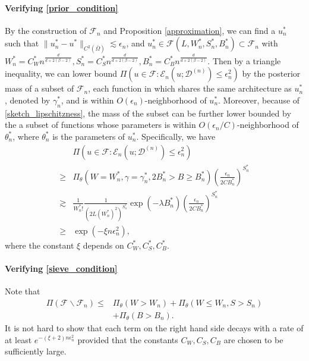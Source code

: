 \documentclass{article}
\newcommand{\F}{\mathcal{F}}
\newcommand{\D}{\mathcal{D}}
\theoremstyle{plain}
\theoremstyle{definition}
\theoremstyle{remark}
\begin{document}
\paragraph{Verifying \eqref{prior_condition}}
By the construction of $\F_n$ and Proposition \ref{approximation}, we can find a $u_n^*$ such that $\|u_n^* - u^*\|_{C^2(\bar{\Omega})} \lesssim \epsilon_n$, and $u_n^\ast \in \F(L, W_n^*, S_n^*, B_n^*) \subset \F_n$ with $W_n^* = C_W^* n^{\frac{d}{d + 2(\beta-2)}}, S_n^* = C_S^* n^{\frac{d}{d + 2(\beta-2)}}, B_n^* = C_B^* n^{\frac{d}{d + 2(\beta-2)}}$. Then by a triangle inequality, we can lower bound
$\Pi(u \in \F: \mathcal{E}_n(u;\D^{(n)}) \leq \epsilon_n^2)$ by the posterior mass of a subset of $\F_n$, each function in which shares the same architecture as $u_n^\ast$, denoted by $\gamma_n^\ast$, and is within $O(\epsilon_n)$-neighborhood of $u_n^\ast$. Moreover, because of \eqref{sketch_lipschitzness}, the mass of the subset can be further lower bounded by the a subset of functions whose parameters is within $O(\epsilon_n / C)$-neighborhood of $\theta_n^\ast$, where $\theta_n^\ast$ is the parameters of $u_n^\ast$. Specifically, we have
\begin{align*}
    & \Pi(u \in \F: \mathcal{E}_n(u;\D^{(n)}) \leq \epsilon_n^2) \\
    \geq & \Pi_\theta(W = W_n^*, \gamma = \gamma_n^*, 2B_{n}^* > B \geq B_{n}^*) \left(\frac{\epsilon_n}{2 C B_n^\ast}\right)^{S_n^\ast} \\
    \gtrsim &  \frac{1}{W_n^\ast !} \frac{1}{(2 L (W_n^\ast)^2)^{S_n^\ast}} \exp(-\lambda B_n^\ast) \left(\frac{\epsilon_n}{2 C B_n^\ast}\right)^{S_n^\ast}\\
    \geq & \exp(-\xi n \epsilon_n^2),
\end{align*}
where the constant $\xi$ depends on $C_W^\ast, C_S^\ast, C_B^\ast$. 


\paragraph{Verifying \eqref{sieve_condition}}
Note that 
\begin{align*}
    \Pi(\F \backslash \F_n) \leq & \Pi_\theta(W > W_n) + \Pi_\theta(W \leq W_{n}, S > S_n) \\
    & + \Pi_\theta(B > B_n).
\end{align*}
It is not hard to  show that each term on the right hand side decays with a rate of at least $e^{-(\xi + 2) n\epsilon_n^2}$ provided that the constants $C_W, C_S, C_B$ are chosen to be sufficiently large. 
\end{document}
